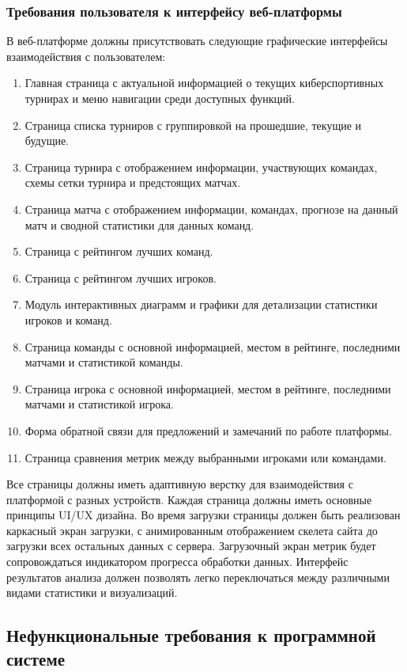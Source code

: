 \subsubsection{Требования пользователя к интерфейсу веб-платформы}

В веб-платформе должны присутствовать следующие графические интерфейсы взаимодействия с пользователем:

\begin{enumerate}
	\item Главная страница с актуальной информацией о текущих киберспортивных турнирах и меню навигации среди доступных функций.
	\item Страница списка турниров с группировкой на прошедшие, текущие и будущие.
	\item Страница турнира с отображением информации, участвующих командах, схемы сетки турнира и предстоящих матчах.
	\item Страница матча с отображением информации, командах, прогнозе на данный матч и сводной статистики для данных команд.
	\item Страница с рейтингом лучших команд.
	\item Страница с рейтингом лучших игроков.
	\item Модуль интерактивных диаграмм и графики для детализации статистики игроков и команд.
	\item Страница команды с основной информацией, местом в рейтинге, последними матчами и статистикой команды.
	\item Страница игрока с основной информацией, местом в рейтинге, последними матчами и статистикой игрока.
	\item Форма обратной связи для предложений и замечаний по работе платформы.
	\item Страница сравнения метрик между выбранными игроками или командами.
\end{enumerate}

Все страницы должны иметь адаптивную верстку для взаимодействия с платформой с разных устройств. Каждая страница должны иметь основные принципы UI/UX дизайна.
Во время загрузки страницы должен быть реализован каркасный экран загрузки, с анимированным отображением скелета сайта до загрузки всех остальных данных с сервера. Загрузочный экран метрик будет сопровождаться индикатором прогресса обработки данных. Интерфейс результатов анализа должен позволять легко переключаться между различными видами статистики и визуализаций.

\subsection{Нефункциональные требования к программной системе}
